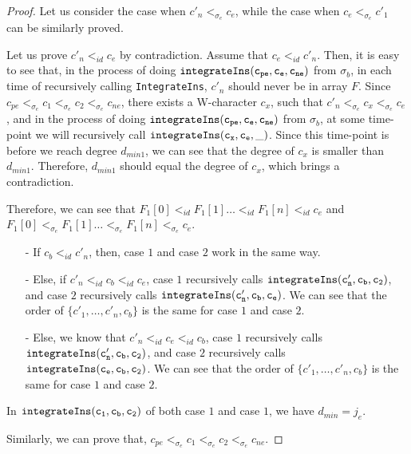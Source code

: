 \begin {proof}
Let us consider the case when $c'_n <_{\sigma_e} c_e$, while the case when $c_e <_{\sigma_e} c'_1$ can be similarly proved.

Let us prove $c'_n <_{id} c_e$ by contradiction. Assume that $c_e <_{id} c'_n$. Then, it is easy to see that, in the process of doing $\alabelshort[{\tt integrateIns}]{c_{pe},c_e,c_{ne}}$ from $\sigma_b$, in each time of recursively calling {\tt IntegrateIns}, $c'_n$ should never be in array $F$. Since $c_{pe} <_{\sigma_e} c_1 <_{\sigma_e} c_2 <_{\sigma_e} c_{ne}$, there exists a W-character $c_x$, such that $c'_n <_{\sigma_e} c_x <_{\sigma_e} c_e$, and in the process of doing $\alabelshort[{\tt integrateIns}]{c_{pe},c_e,c_{ne}}$ from $\sigma_b$, at some time-point we will recursively call $\alabelshort[{\tt integrateIns}]{c_x,c_e,\_}$. Since this time-point is before we reach degree $d_{min1}$, we can see that the degree of $c_x$ is smaller than $d_{min1}$. Therefore, $d_{min1}$ should equal the degree of $c_x$, which brings a contradiction.

Therefore, we can see that $F_1[0] <_{id} F_1[1] \ldots <_{id} F_1[n] <_{id} c_e$ and $F_1[0] <_{\sigma_e} F_1[1] \ldots <_{\sigma_e} F_1[n] <_{\sigma_e} c_e$.

\begin{itemize}
\setlength{\itemsep}{0.5pt}
\item[-] If $c_b <_{id} c'_n$, then, case $1$ and case $2$ work in the same way.

\item[-] Else, if $c'_n <_{id} c_b <_{id} c_e$, case $1$ recursively calls $\alabelshort[{\tt integrateIns}]{c'_n,c_b,c_2}$, and case $2$ recursively calls $\alabelshort[{\tt integrateIns}]{c'_n,c_b,c_e}$. We can see that the order of $\{ c'_1,\ldots,c'_n,c_b \}$ is the same for case $1$ and case $2$.

\item[-] Else, we know that $c'_n <_{id} c_e <_{id} c_b$, case $1$ recursively calls $\alabelshort[{\tt integrateIns}]{c'_n,c_b,c_2}$, and case $2$ recursively calls $\alabelshort[{\tt integrateIns}]{c_e,c_b,c_2}$. We can see that the order of $\{ c'_1,\ldots,c'_n,c_b \}$ is the same for case $1$ and case $2$.
\end{itemize}


 In $\alabelshort[{\tt integrateIns}]{c_1,c_b,c_2}$ of both case $1$ and case $1$, we have $d_{min} = j_e$.

Similarly, we can prove that, $c_{pe} <_{\sigma_e} c_1 <_{\sigma_e} c_2 <_{\sigma_e} c_{ne}$.


\end{proof}
